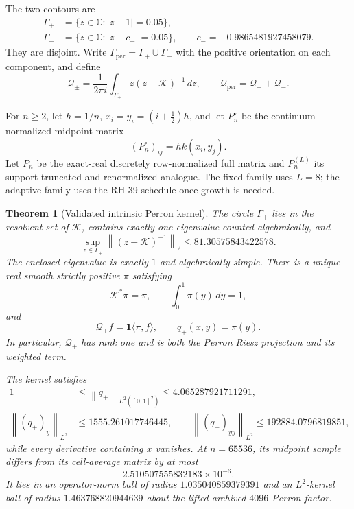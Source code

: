 \documentclass[11pt]{article}
\newtheorem{theorem}{Theorem}[section]
\theoremstyle{definition}
\theoremstyle{remark}
\newcommand{\C}{\mathbb C}
\newcommand{\cK}{\mathcal K}
\newcommand{\cQ}{\mathcal Q}
\newcommand{\norm}[1]{\left\lVert #1\right\rVert}
\begin{document}
The two contours are
\begin{align}
 \Gamma_+&=\{z\in\C:|z-1|=0.05\},
 \label{eq:perron-contour}\\
 \Gamma_-&=\{z\in\C:|z-c_-|=0.05\},
 \qquad c_-=-0.9865481927458079.
 \label{eq:parity-contour}
\end{align}
They are disjoint.  Write $\Gamma_{\mathrm{per}}=\Gamma_+\cup\Gamma_-$
with the positive orientation on each component, and define
\begin{equation}
 \cQ_\pm
 =\frac{1}{2\pi i}\int_{\Gamma_\pm}z(z-\cK)^{-1}\,dz,
 \qquad
 \cQ_{\mathrm{per}}=\cQ_++\cQ_-.
 \label{eq:qpm}
\end{equation}

For $n\ge2$, let $h=1/n$, $x_i=y_i=(i+\tfrac12)h$, and let
$P_n^\circ$ be the continuum-normalized midpoint matrix
\[
 (P_n^\circ)_{ij}=h k(x_i,y_j).
\]
Let $P_n$ be the exact-real discretely row-normalized full matrix and
$P_n^{(L)}$ its support-truncated and renormalized analogue.  The fixed
family uses $L=8$; the adaptive family uses the RH-39 schedule once growth
is needed.

\begin{theorem}[Validated intrinsic Perron kernel]
\label{thm:perron}
The circle $\Gamma_+$ lies in the resolvent set of $\cK$, contains exactly
one eigenvalue counted algebraically, and
\begin{equation}
 \sup_{z\in\Gamma_+}\norm{(z-\cK)^{-1}}_2
 \le81.30575843422578.
 \label{eq:perron-resolvent}
\end{equation}
The enclosed eigenvalue is exactly $1$ and algebraically simple.  There is a
unique real smooth strictly positive $\pi$ satisfying
\[
 \cK^*\pi=\pi,
 \qquad \int_0^1\pi(y)\,dy=1,
\]
and
\begin{equation}
 \cQ_+f=\mathbf1\langle\pi,f\rangle,
 \qquad q_+(x,y)=\pi(y).
 \label{eq:qplus-form}
\end{equation}
In particular, $\cQ_+$ has rank one and is both the Perron Riesz projection
and its weighted term.

The kernel satisfies
\begin{align}
 1&\le\norm{q_+}_{L^2([0,1]^2)}\le4.065287921711291,
 \label{eq:qplus-norm}\\
 \norm{(q_+)_y}_{L^2}&\le1555.261017746445,
 \qquad
 \norm{(q_+)_{yy}}_{L^2}\le192884.0796819851,
 \label{eq:qplus-derivatives}
\end{align}
while every derivative containing $x$ vanishes.  At $n=65536$, its midpoint
sample differs from its cell-average matrix by at most
\begin{equation}
 2.510507555832183\times10^{-6}.
 \label{eq:qplus-midpoint}
\end{equation}
It lies in an operator-norm ball of radius $1.035040859379391$ and an
$L^2$-kernel ball of radius $1.463768820944639$ about the lifted archived
$4096$ Perron factor.
\end{theorem}
\end{document}
